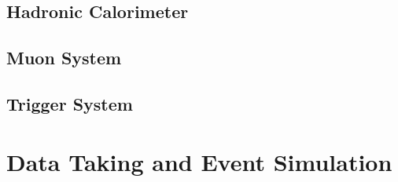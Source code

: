 \subsection{Hadronic Calorimeter}
\label{subsec:cms_hcal}

\subsection{Muon System}
\label{subsec:cms_muon}

\subsection{Trigger System}
\label{subsec:cms_trigger}

\section{Data Taking and Event Simulation}
\label{sec:data}

